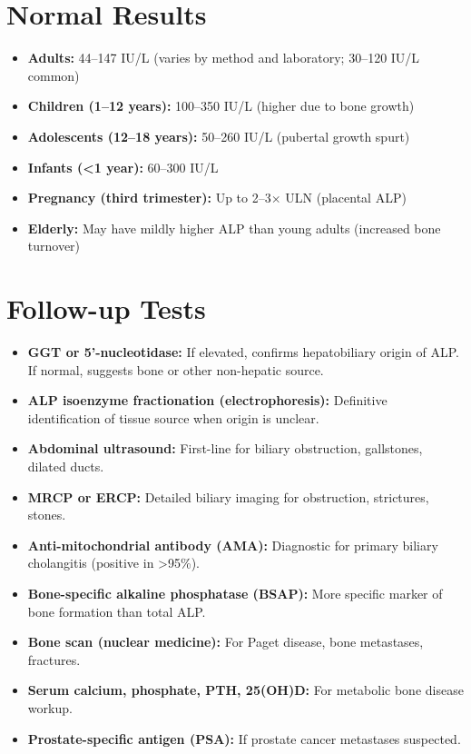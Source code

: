 \section*{Normal Results}
\begin{itemize}
  \item \textbf{Adults:} 44--147 IU/L (varies by method and laboratory; 30--120 IU/L common)
  \item \textbf{Children (1--12 years):} 100--350 IU/L (higher due to bone growth)
  \item \textbf{Adolescents (12--18 years):} 50--260 IU/L (pubertal growth spurt)
  \item \textbf{Infants (<1 year):} 60--300 IU/L
  \item \textbf{Pregnancy (third trimester):} Up to 2--3$\times$ ULN (placental ALP)
  \item \textbf{Elderly:} May have mildly higher ALP than young adults (increased bone turnover)
\end{itemize}

\section*{Follow-up Tests}
\begin{itemize}
  \item \textbf{GGT or 5'-nucleotidase:} If elevated, confirms hepatobiliary origin of ALP. If normal, suggests bone or other non-hepatic source.
  \item \textbf{ALP isoenzyme fractionation (electrophoresis):} Definitive identification of tissue source when origin is unclear.
  \item \textbf{Abdominal ultrasound:} First-line for biliary obstruction, gallstones, dilated ducts.
  \item \textbf{MRCP or ERCP:} Detailed biliary imaging for obstruction, strictures, stones.
  \item \textbf{Anti-mitochondrial antibody (AMA):} Diagnostic for primary biliary cholangitis (positive in >95\%).
  \item \textbf{Bone-specific alkaline phosphatase (BSAP):} More specific marker of bone formation than total ALP.
  \item \textbf{Bone scan (nuclear medicine):} For Paget disease, bone metastases, fractures.
  \item \textbf{Serum calcium, phosphate, PTH, 25(OH)D:} For metabolic bone disease workup.
  \item \textbf{Prostate-specific antigen (PSA):} If prostate cancer metastases suspected.
\end{itemize}

